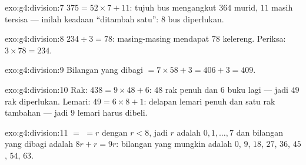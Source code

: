 \begin{solution}{exo:g4:division:7}
$375 = 52 \times 7 + 11$: tujuh bus mengangkut $364$ murid, $11$
masih tersisa --- inilah keadaan ``ditambah satu'': $8$ bus diperlukan.
\end{solution}

\begin{solution}{exo:g4:division:8}
$234 \div 3 = 78$: masing-masing mendapat $78$ kelereng. Periksa:
$3 \times 78 = 234$.
\end{solution}

\begin{solution}{exo:g4:division:9}
Bilangan yang dibagi $= 7 \times 58 + 3 = 406 + 3 = 409$.
\end{solution}

\begin{solution}{exo:g4:division:10}
Rak: $438 = 9 \times 48 + 6$: $48$ rak penuh dan $6$ buku lagi ---
jadi $49$ rak diperlukan. Lemari:
$49 = 6 \times 8 + 1$: delapan lemari penuh dan satu rak tambahan
--- jadi $9$ lemari harus dibeli.
\end{solution}

\begin{solution}{exo:g4:division:11}
 $=$  $= r$ dengan $r < 8$, jadi $r$ adalah $0, 1, \dots,
7$ dan bilangan yang dibagi adalah $8r + r = 9r$: bilangan yang
mungkin adalah $0$, $9$, $18$, $27$, $36$, $45$, $54$, $63$.

\end{solution}

